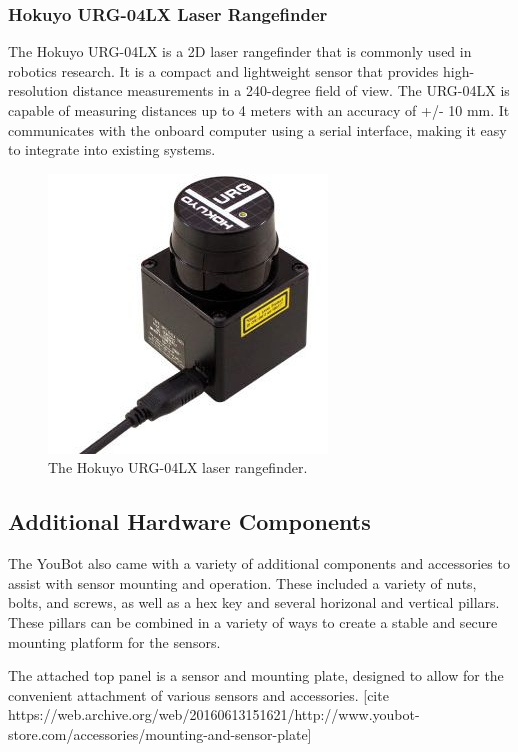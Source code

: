 \documentclass[a4paper, 12pt]{article}
\newif\ifshownotes
\newcommand{\notes}[1]{\ifshownotes\textcolor{blue}{#1}\fi}
\begin{document}
    \subsubsection{Hokuyo URG-04LX Laser Rangefinder}

    The Hokuyo URG-04LX is a 2D laser rangefinder that is commonly used in robotics research. It is a compact and lightweight sensor that provides high-resolution distance measurements in a 240-degree field of view. The URG-04LX is capable of measuring distances up to 4 meters with an accuracy of +/- 10 mm. It communicates with the onboard computer using a serial interface, making it easy to integrate into existing systems. 

    \begin{figure}[ht]
        \centering
        \includegraphics[width=0.25\linewidth]{images/sec2/hokuyo.png}
        \caption{The Hokuyo URG-04LX laser rangefinder.}
    \end{figure}

    \subsection{Additional Hardware Components}

    
    \notes{DESCRIBE THE INITIAL INSPECTION IN FULL HERE! TALK ABOUT THE PILLAR STUFF AND NUTS AND WHATNOT AS WELL!!!!}

    The YouBot also came with a variety of additional components and accessories to assist with sensor mounting and operation. These included a variety of nuts, bolts, and screws, as well as a hex key and several horizonal and vertical pillars. These pillars can be combined in a variety of ways to create a stable and secure mounting platform for the sensors. 

    The attached top panel is a sensor and mounting plate, designed to allow for the convenient attachment of various sensors and accessories. [cite https://web.archive.org/web/20160613151621/http://www.youbot-store.com/accessories/mounting-and-sensor-plate]
\end{document}
